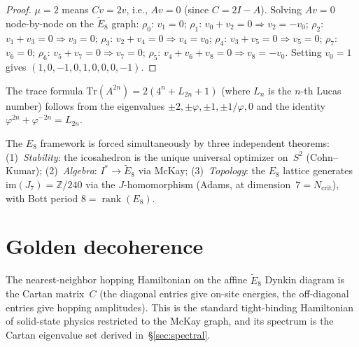 \begin{proof}
$\mu = 2$ means $Cv = 2v$, i.e., $Av = 0$ (since $C = 2I - A$).
Solving $Av = 0$ node-by-node on the $\tilde{E}_8$ graph:
$\rho_0$: $v_1 = 0$;
$\rho_1$: $v_0 + v_2 = 0 \Rightarrow v_2 = -v_0$;
$\rho_2$: $v_1 + v_3 = 0 \Rightarrow v_3 = 0$;
$\rho_3$: $v_2 + v_4 = 0 \Rightarrow v_4 = v_0$;
$\rho_4$: $v_3 + v_5 = 0 \Rightarrow v_5 = 0$;
$\rho_7$: $v_6 = 0$;
$\rho_6$: $v_5 + v_7 = 0 \Rightarrow v_7 = 0$;
$\rho_5$: $v_4 + v_6 + v_8 = 0 \Rightarrow v_8 = -v_0$.
Setting $v_0 = 1$ gives $(1, 0, -1, 0, 1, 0, 0, 0, -1)$.
\end{proof}

The trace formula $\mathrm{Tr}(A^{2n}) = 2(4^n + L_{2n} + 1)$
(where $L_n$ is the $n$-th Lucas number) follows from the eigenvalues
$\pm 2, \pm\varphi, \pm 1, \pm 1/\varphi, 0$ and the identity
$\varphi^{2n} + \varphi^{-2n} = L_{2n}$.

\begin{remark}
The $E_8$ framework is forced simultaneously by three independent theorems:
(1)~\emph{Stability}: the icosahedron is the unique universal optimizer
on~$S^2$ (Cohn--Kumar);
(2)~\emph{Algebra}: $I^* \to \tilde{E}_8$ via McKay;
(3)~\emph{Topology}: the $E_8$ lattice generates
$\mathrm{im}(J_7) = \mathbb{Z}/240$ via the $J$-homomorphism
(Adams, at dimension~$7 = N_{\mathrm{crit}}$),
with Bott period $8 = \operatorname{rank}(E_8)$.
\end{remark}

\section{Golden decoherence}
\label{sec:decoherence}

The nearest-neighbor hopping Hamiltonian on the affine $\tilde{E}_8$
Dynkin diagram is the Cartan matrix~$C$ (the diagonal entries give on-site
energies, the off-diagonal entries give hopping amplitudes).
This is the standard tight-binding Hamiltonian of solid-state physics
restricted to the McKay graph, and its spectrum is the Cartan eigenvalue
set derived in~\S\ref{sec:spectral}.

